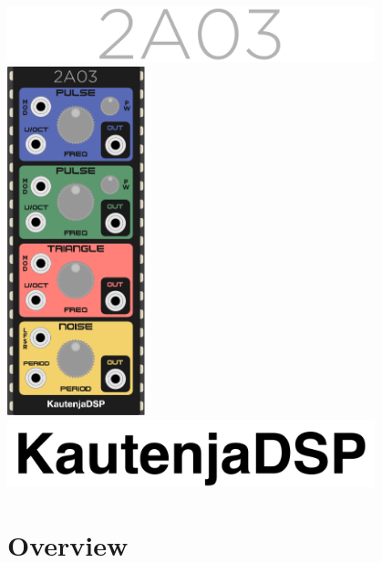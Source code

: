 \documentclass[12pt,a4paper]{article}
\begin{document}

\thispagestyle{empty}
\vspace*{\fill}
\begin{center}
\includegraphics[width=0.8\textwidth]{2A03-Logo}
\linebreak\linebreak\linebreak\linebreak
\includegraphics[width=0.3\textwidth]{2A03-Module}
\linebreak\linebreak\linebreak\linebreak
\includegraphics[width=0.8\textwidth]{KautenjaDSP}
\end{center}
\vspace*{\fill}
\clearpage


\section{Overview}
\end{document}
